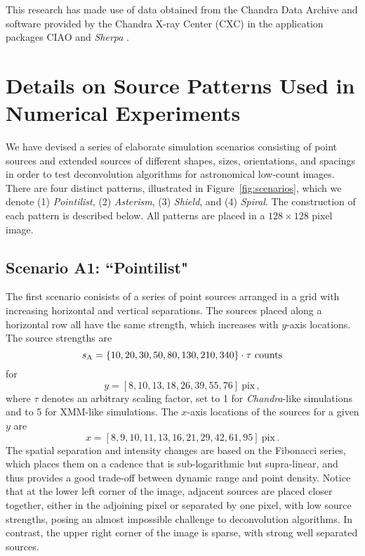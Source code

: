 \documentclass[twocolumn, lineno]{aastex631}
\begin{document}
    This research has made use of data obtained from the Chandra Data Archive and software provided by the Chandra X-ray Center (CXC) in the application packages CIAO \citep{Fruscione2006} and {\it Sherpa} \citep{Freeman2001,Burke2022}.
    
    \newpage
    

    \appendix
    \section{Details on Source Patterns Used in Numerical Experiments}
    
    \label{sec:app:A}

    We have devised a series of elaborate simulation scenarios  consisting of point sources and extended sources of different shapes, sizes, orientations, and spacings in order to test deconvolution algorithms for astronomical low-count images.  There are four distinct patterns, illustrated in Figure~\ref{fig:scenarios}, which we denote (1) {\sl Pointilist}, (2) {\sl Asterism}, (3) {\sl Shield}, and (4) {\sl Spiral}.  The construction of each pattern is described below.  All patterns are placed in a $128{\times}128$ pixel image.

    \subsection{Scenario A1: ``Pointilist"}
    The first scenario conisists of a series of point sources arranged in a grid with increasing horizontal and vertical separations.  The sources placed along a horizontal row all have the same strength, which increases with $y$-axis locations.  The source strengths are 
    $$s_{\rm A} = \{10, 20, 30, 50, 80, 130, 210, 340\} \cdot \tau ~\textrm{counts} $$
    for
    $$y = [8, 10, 13, 18, 26, 39, 55, 76]~\textrm{pix} \,,$$
    where $\tau$ denotes an arbitrary scaling factor, set to 1 for \textit{Chandra}-like simulations and to 5 for XMM-like simulations.
    The $x$-axis locations of the sources for a given $y$ are
    $$x=[8, 9, 10, 11, 13, 16, 21, 29, 42, 61, 95]~\textrm{pix} \,.$$
    The spatial separation and intensity changes are based on the Fibonacci series, which places them on a cadence that is sub-logarithmic but supra-linear, and thus provides a good trade-off between dynamic range and point density. Notice that at the lower left corner of the image, adjacent sources are placed closer together, either in the adjoining pixel or separated by one pixel, with low source strengths, posing an almost impossible challenge to deconvolution algorithms.  In contrast, the upper right corner of the image is sparse, with strong well separated sources.
\end{document}
